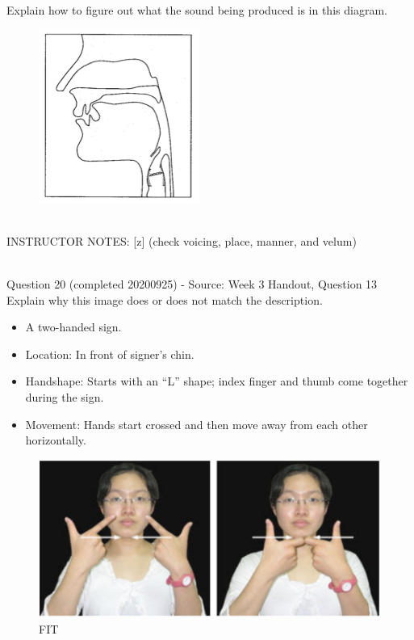 \documentclass[12pt]{article}
\begin{document}
Explain how to figure out what the sound being produced is in this diagram.\\

\begin{figure}[H]
\includegraphics{../images/sagittal_z.png}
\end{figure}

~\\
INSTRUCTOR NOTES: [z] (check voicing, place, manner, and velum)


~\\

{\large Question 20} (completed 20200925) - Source: Week 3 Handout, Question 13\\

Explain why this image does or does not match the description.\\

\begin{itemize} \item A two-handed sign. \item Location: In front of signer’s chin. \item Handshape: Starts with an “L” shape; index finger and thumb come together during the sign. \item Movement: Hands start crossed and then move away from each other horizontally. \end{itemize}

\begin{figure}[H]
\includegraphics{../images/taiwansign_fit.png}
\caption{FIT}
\end{figure}
\end{document}
